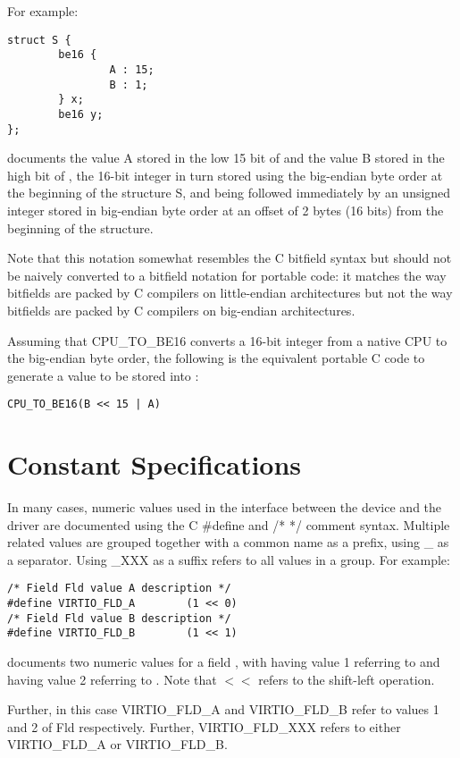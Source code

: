 For example:
\begin{lstlisting}
struct S {
        be16 {
                A : 15;
                B : 1;
        } x;
        be16 y;
};
\end{lstlisting}
documents the value A stored in the low 15 bit of  and
the value B stored in the high bit of , the 16-bit
integer  in turn stored using the big-endian byte order
at the beginning of the structure S,
and being followed immediately by an unsigned integer 
stored in big-endian byte order at an offset of 2 bytes (16 bits)
from the beginning of the structure.

Note that this notation somewhat resembles the C bitfield syntax but
should not be naively converted to a bitfield notation for portable
code: it matches the way bitfields are packed by C compilers on
little-endian architectures but not the way bitfields are packed by C
compilers on big-endian architectures.

Assuming that CPU_TO_BE16 converts a 16-bit integer from a native
CPU to the big-endian byte order, the following is the equivalent
portable C code to generate a value to be stored into :
\begin{lstlisting}
CPU_TO_BE16(B << 15 | A)
\end{lstlisting}
\section{Constant Specifications}\label{sec:Constant Specifications}

In many cases, numeric values used in the interface between the device
and the driver are documented using the C \#define and /* */
comment syntax. Multiple related values are grouped together with
a common name as a prefix, using _ as a separator.
Using _XXX as a suffix refers to all values in a group.
For example:

\begin{lstlisting}
/* Field Fld value A description */
#define VIRTIO_FLD_A        (1 << 0)
/* Field Fld value B description */
#define VIRTIO_FLD_B        (1 << 1)
\end{lstlisting}
documents two numeric values for a field , with
 having value 1 referring to  and 
having value 2 referring to .
Note that $<<$ refers to the shift-left operation.

Further, in this case VIRTIO_FLD_A and VIRTIO_FLD_B
refer to values 1 and 2 of Fld respectively. Further, VIRTIO_FLD_XXX refers to
either VIRTIO_FLD_A or VIRTIO_FLD_B.

\newpage

